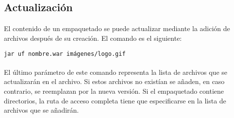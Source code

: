 \documentclass{article}
\begin{document}
	\subsection{Actualización}
	
	\paragraph{}El contenido de un empaquetado se puede actualizar mediante la adición de archivos después de su creación. El comando es el siguiente:
	
	\begin{center}
		\texttt{jar uf nombre.war imágenes/logo.gif}
	\end{center}
	
	\paragraph{}El último parámetro de este comando representa la lista de archivos que se actualizarán en el archivo. Si estos archivos no existían se añaden, en caso contrario, se reemplazan por la nueva versión. Si el empaquetado contiene directorios, la ruta de acceso completa tiene que especificarse en la lista de archivos que se añadirán.
	
\end{document}
